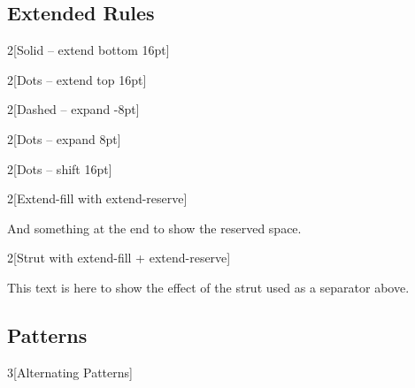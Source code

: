 \documentclass{article}
\begin{document}
\subsection*{Extended Rules}
\setlength{\columnsep}{24pt}

\begin{multicols}{2}[Solid -- extend bottom 16pt]
  \lipsum[1]
\end{multicols}

\begin{multicols}{2}[Dots -- extend top 16pt]
  \lipsum[1]
\end{multicols}

\begin{multicols}{2}[Dashed -- expand -8pt]
  \lipsum[1]
\end{multicols}

\begin{multicols}{2}[Dots -- expand 8pt]
  \lipsum[1]
\end{multicols}

\begin{multicols}{2}[Dots -- shift 16pt]
  \lipsum[1-2]
\end{multicols}

\begin{multicols}{2}[Extend-fill with extend-reserve]
  \lipsum[1-2]
\end{multicols}
And something at the end to show the reserved space.

\begin{multicols}{2}[Strut with extend-fill + extend-reserve]
  \lipsum[1-3]
\end{multicols}
This text is here to show the effect of the strut used as a separator above. 

\subsection*{Patterns}

\begin{multicols}{3}[Alternating Patterns]
  \lipsum[1-3]
\end{multicols}
\end{document}
